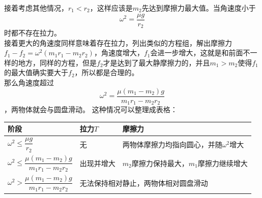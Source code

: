 \begin{casetypebox}[title={\strut\textcolor{white}{\bfseries 常见题型：水平圆盘、两侧物体、重心不在圆心}}]
  接着考虑其他情况，$r_1<r_2$，这样应该是$m_2$先达到摩擦力最大值。当角速度小于\[\omega^2=\frac{\mu g}{r_2}\]时都不存在拉力。\\
  接着更大的角速度同样意味着存在拉力，列出类似的方程组，解出摩擦力$f_1-f_2=\omega^2(m_1r_1-m_2r_2)$，角速度增大，$f_1$会进一步增大，这就是和前面不一样的地方，同样的方程，但是$f_2$才是达到了最大静摩擦力的，并且$m_1>m_2$使得$f_1$的最大值确实要大于$f_2$，所以都是合理的。\\
  那么角速度超过\[\omega^2=\frac{\mu(m_1-m_2)g}{m_1r_1-m_2r_2}\]，两物体就会与圆盘滑动。
  这种情况可以整理成表格：
  \begin{center}
    \begingroup
    \small
    \begin{tabular}{|p{}|p{}|p{}|}
      \hline
      阶段 & 拉力$T$ & 摩擦力\\
      \hline
      $\omega^2\leq \dfrac{\mu g}{r_2}$& 无 & 两物体摩擦力均指向圆心，并随$\omega^2$增大 \\
      \hline
      $\omega^2\leq\dfrac{\mu(m_1-m_2)g}{m_1r_1-m_2r_2}$ & 出现并增大 & $m_2$摩擦力保持最大，$m_1$摩擦力继续增大\\
      \hline
      $\omega^2>\dfrac{\mu(m_1-m_2)g}{m_1r_1-m_2r_2}$& \multicolumn{2}{|p{0.58\columnwidth}|}{无法保持相对静止，两物体相对圆盘滑动}\\
      \hline
    \end{tabular}
    \endgroup
  \end{center}
\end{casetypebox}

